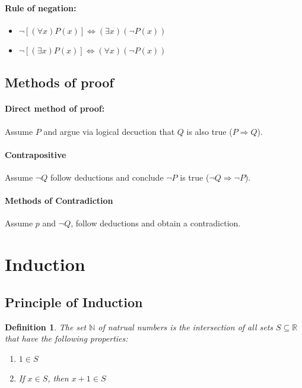 \documentclass[12pt]{article}
\newtheorem{definition}{Definition}[subsection]
\begin{document}
    \paragraph{\textbf{Rule of negation:}}
        \begin{itemize}
            \item $\neg [(\forall x) P(x)] \Leftrightarrow (\exists x)(\neg P(x))$
            \item $\neg [(\exists x) P(x)] \Leftrightarrow (\forall x)(\neg P(x))$
        \end{itemize}

\subsection{Methods of proof}
    \paragraph{Direct method of proof:} Assume $P$ and argue via logical decuction that $Q$ is also true ($P \Rightarrow Q$).

    \paragraph{Contrapositive} Assume $\neg Q$ follow deductions and conclude $\neg P$ is true ($\neg Q \Rightarrow \neg P$).
    
    \paragraph{Methods of Contradiction} Assume $p$ and $\neg Q$, follow deductions and obtain a contradiction.
    
    \section{Induction}
    	\subsection{Principle of Induction}
	\begin{definition}
		The set $\mathbb{N}$ of natrual numbers is the intersection of all sets $S \subseteq \mathbb{R}$ that have the following properties:
		\begin{enumerate}
			\item $1 \in S$
			\item If $x \in S$, then $x + 1 \in S$
		\end{enumerate}
	\end{definition}
	
\end{document}
